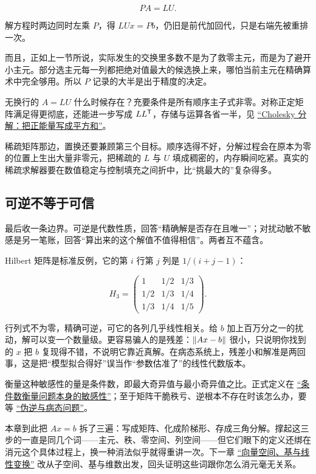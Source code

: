 \[
PA=LU.
\]

解方程时两边同时左乘 \(P\)，得 \(LUx=Pb\)，仍旧是前代加回代，只是右端先被重排一次。

而且，正如上一节所说，实际发生的交换里多数不是为了救零主元，而是为了避开小主元。部分选主元每一列都把绝对值最大的候选换上来，哪怕当前主元在精确算术中完全够用。所以 \(P\) 记录的大半是出于精度的决定。

无换行的 \(A=LU\) 什么时候存在？充要条件是所有顺序主子式非零。对称正定矩阵满足得更彻底，还能进一步写成 \(LL^{\mathsf{T}}\)，存储与运算各省一半，见 \hyperref[sec:03-Linear-Algebra/06-Symmetric-and-Positive-Definite-Matrices/03]{``Cholesky 分解：把正能量写成平方和''}。

稀疏矩阵那边，置换还要兼顾第三个目标。顺序选得不好，分解过程会在原本为零的位置上生出大量非零元，把稀疏的 \(L\) 与 \(U\) 填成稠密的，内存瞬间吃紧。真实的稀疏求解器要在数值稳定与控制填充之间折中，比``挑最大的''复杂得多。

\subsection{可逆不等于可信}

最后收一条边界。可逆是代数性质，回答``精确解是否存在且唯一''；对扰动敏不敏感是另一笔账，回答``算出来的这个解值不值得相信''。两者互不蕴含。

Hilbert 矩阵是标准反例，它的第 \(i\) 行第 \(j\) 列是 \(1/(i+j-1)\)：

\[
H_3=\begin{pmatrix}
1&1/2&1/3\\
1/2&1/3&1/4\\
1/3&1/4&1/5
\end{pmatrix}.
\]

行列式不为零，精确可逆，可它的各列几乎线性相关。给 \(b\) 加上百万分之一的扰动，解可以变一个数量级。更容易骗人的是残差：\(\left\lVert Ax-b\right\rVert\) 很小，只说明你找到的 \(x\) 把 \(b\) 复现得不错，不说明它靠近真解。在病态系统上，残差小和解准是两回事，这是把``模型拟合得好''误当作``参数估准了''的线性代数版本。

衡量这种敏感性的量是条件数，即最大奇异值与最小奇异值之比。正式定义在 \hyperref[sec:08-Numerical-Analysis/01-Floating-Point-and-Error/03]{``条件数衡量问题本身的敏感性''}；至于矩阵干脆秩亏、逆根本不存在时该怎么办，要等 \hyperref[sec:03-Linear-Algebra/07-SVD-and-Data-Applications/02]{``伪逆与病态问题''}。

本章到此把 \(Ax=b\) 拆了三遍：写成矩阵、化成阶梯形、存成三角分解。撑起这三步的一直是同几个词——主元、秩、零空间、列空间——但它们眼下的定义还绑在消元这个具体过程上，换一种消法似乎就得重讲一次。下一章 \hyperref[ch:017]{``向量空间、基与线性变换''} 改从子空间、基与维数出发，回头证明这些词跟你怎么消元毫无关系。
